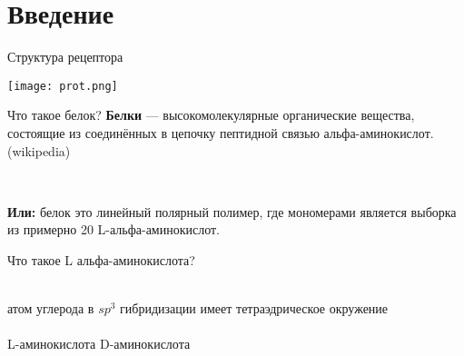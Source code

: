 
\begin{frame}[plain]
  \titlepage
\end{frame}




\section{Введение}

\begin{frame}
    {Структура рецептора}
	\begin{center}
          \texttt{[image: prot.png]}
	  \end{center}
  \end{frame}


\begin{frame}
    {Что такое белок?}{}
	\textbf{Белки}  — высокомолекулярные органические вещества, состоящие из соединённых в цепочку пептидной связью альфа-аминокислот.(wikipedia) \\
	\vspace{.5cm}
	\begin{center}
	\small%
	\\
	\vspace{.5cm}
    \end{center}
	\textbf{Или:} белок это линейный полярный полимер, где мономерами является выборка из примерно 20 L-альфа-аминокислот. 

\end{frame}


\begin{frame}
    {Что такое  L альфа-аминокислота?}{}
	\begin{center}
  \\
 \small
 атом углерода в $sp^3$ гибридизации имеет тетраэдрическое окружение\\
  \vspace{.5cm}
 \hspace{1cm}
 \\
 \vspace{.2cm}
 L-аминокислота \hspace{1cm} D-аминокислота \\
 \end{center}
\end{frame}

